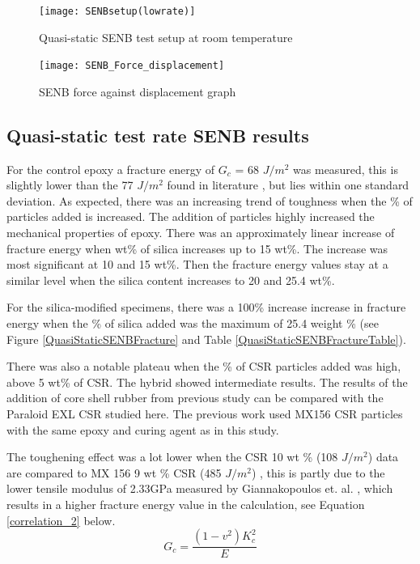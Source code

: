 \documentclass[numbers=noendperiod,chapterprefix=on]{icldt} %
\begin{document}
\begin{figure}[!hp]
\centering
\texttt{[image: SENBsetup(lowrate)]}
\caption{Quasi-static SENB test setup at room temperature} \label{SENBsetup}
\end{figure}
\FloatBarrier


\begin{figure}[!hp]
\centering
\texttt{[image: SENB\_Force\_displacement]}
\caption{SENB force against displacement graph} \label{SENB_Force_displacement}
\end{figure}
\FloatBarrier

\subsection{Quasi-static test rate SENB results} \label{SENB_results}

For the control epoxy a fracture energy of $G_c $ = 68 $J/m^2$ was measured, this is slightly lower than the 77 $J/m^2$ found in literature \cite{Giannakopoulos2011}, but lies within one standard deviation.
As expected, there was an increasing trend of toughness when the \% of particles added is increased. The addition of particles highly increased the mechanical properties of epoxy. 
There was an approximately linear increase of fracture energy when wt\% of silica increases up to 15 wt\%. The increase was most significant at 10 and 15 wt\%. Then the fracture energy values stay at a similar level when the silica content increases to 20 and 25.4 wt\%.

For the silica-modified specimens, there was a 100\% increase increase in fracture energy when the \% of silica added was the maximum of 25.4 weight \% (see Figure \ref{QuasiStaticSENBFracture} and Table \ref{QuasiStaticSENBFractureTable}).

There was also a notable plateau when the \% of CSR particles added was high, above 5 wt\% of CSR. The hybrid showed intermediate results. 
The results of the addition of core shell rubber from previous study can be compared with the Paraloid EXL CSR studied here. The previous work used MX156 CSR particles with the same epoxy and curing agent as in this study.

The toughening effect was a lot lower when the CSR 10 wt \% (108  $J/m^2$) data are compared to MX 156 9 wt \% CSR  (485 $J/m^2$) \cite{Giannakopoulos2011}, this is partly due to the lower tensile modulus of 2.33GPa measured by Giannakopoulos et. al. \cite{Giannakopoulos2011}, which results in a higher fracture energy value in the calculation, see Equation \ref{correlation_2} below.
\begin{equation} \label{correlation_2}
G_c = \frac{(1-v^2) K_c^2}{E} 
\end{equation}
\end{document}

